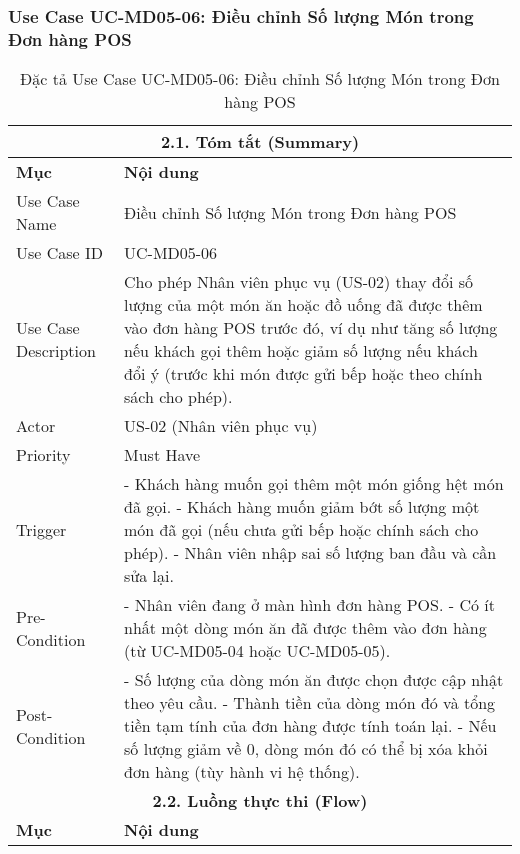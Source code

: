 \subsubsection{Use Case UC-MD05-06: Điều chỉnh Số lượng Món trong Đơn hàng POS}
\begin{longtable}{|m{4cm}|p{11cm}|}
\caption{Đặc tả Use Case UC-MD05-06: Điều chỉnh Số lượng Món trong Đơn hàng POS} \label{tab:uc_md05_06_final} \\
\hline
\multicolumn{2}{|c|}{\textbf{2.1. Tóm tắt (Summary)}} \\
\hline
\textbf{Mục} & \textbf{Nội dung} \\
\hline
\endhead %
\hline
\endfoot %
\hline
\endlastfoot %
Use Case Name & Điều chỉnh Số lượng Món trong Đơn hàng POS \\
\hline
Use Case ID & UC-MD05-06 \\
\hline
Use Case Description & Cho phép Nhân viên phục vụ (US-02) thay đổi số lượng của một món ăn hoặc đồ uống đã được thêm vào đơn hàng POS trước đó, ví dụ như tăng số lượng nếu khách gọi thêm hoặc giảm số lượng nếu khách đổi ý (trước khi món được gửi bếp hoặc theo chính sách cho phép). \\
\hline
Actor & US-02 (Nhân viên phục vụ) \\
\hline
Priority & Must Have \\
\hline
Trigger & - Khách hàng muốn gọi thêm một món giống hệt món đã gọi. \newline - Khách hàng muốn giảm bớt số lượng một món đã gọi (nếu chưa gửi bếp hoặc chính sách cho phép). \newline - Nhân viên nhập sai số lượng ban đầu và cần sửa lại. \\
\hline
Pre-Condition & - Nhân viên đang ở màn hình đơn hàng POS. \newline - Có ít nhất một dòng món ăn đã được thêm vào đơn hàng (từ UC-MD05-04 hoặc UC-MD05-05). \\
\hline
Post-Condition & - Số lượng của dòng món ăn được chọn được cập nhật theo yêu cầu. \newline - Thành tiền của dòng món đó và tổng tiền tạm tính của đơn hàng được tính toán lại. \newline - Nếu số lượng giảm về 0, dòng món đó có thể bị xóa khỏi đơn hàng (tùy hành vi hệ thống). \\
\hline
\multicolumn{2}{|c|}{\textbf{2.2. Luồng thực thi (Flow)}} \\
\hline
\textbf{Mục} & \textbf{Nội dung} \\

\end{longtable}
